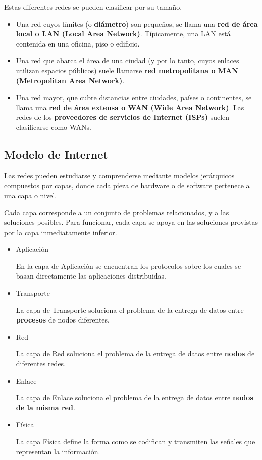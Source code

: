 \documentclass[spanish,A4,]{article}
\begin{document}
Estas diferentes redes se pueden clasificar por su tamaño.

\begin{itemize}
\itemsep1pt\parskip0pt
\item
  Una red cuyos límites (o \textbf{diámetro}) son pequeños, se llama una
  \textbf{red de área local o LAN (Local Area Network)}. Típicamente,
  una LAN está contenida en una oficina, piso o edificio.
\item
  Una red que abarca el área de una ciudad (y por lo tanto, cuyos
  enlaces utilizan espacios públicos) suele llamarse \textbf{red
  metropolitana o MAN (Metropolitan Area Network)}.
\item
  Una red mayor, que cubre distancias entre ciudades, países o
  continentes, se llama una \textbf{red de área extensa o WAN (Wide Area
  Network)}. Las redes de los \textbf{proveedores de servicios de
  Internet (ISPs)} suelen clasificarse como WANs.
\end{itemize}

\subsection{Modelo de Internet}\label{modelo-de-internet}

Las redes pueden estudiarse y comprenderse mediante modelos jerárquicos
compuestos por capas, donde cada pieza de hardware o de software
pertenece a una capa o nivel.

Cada capa corresponde a un conjunto de problemas relacionados, y a las
soluciones posibles. Para funcionar, cada capa se apoya en las
soluciones provistas por la capa inmediatamente inferior.

\begin{itemize}
\item
  Aplicación

  En la capa de Aplicación se encuentran los protocolos sobre los cuales
  se basan directamente las aplicaciones distribuidas.
\item
  Transporte

  La capa de Transporte soluciona el problema de la entrega de datos
  entre \textbf{procesos} de nodos diferentes.
\item
  Red

  La capa de Red soluciona el problema de la entrega de datos entre
  \textbf{nodos} de diferentes redes.
\item
  Enlace

  La capa de Enlace soluciona el problema de la entrega de datos entre
  \textbf{nodos de la misma red}.
\item
  Física

  La capa Física define la forma como se codifican y transmiten las
  señales que representan la información.
\end{itemize}
\end{document}
